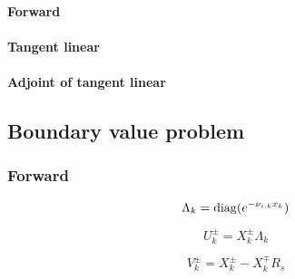 \paragraph{Forward}
\label{sec:dom-layer_quantities-particular_solution-forward}


%
\paragraph{Tangent linear}
\label{sec:dom-layer_quantities-particular_solution-tangent_linear}


%
\paragraph{Adjoint of tangent linear}
\label{sec:dom-layer_quantities-particular_solution-adjoint_of_tangent_linear}


%
\subsection{Boundary value problem}
\label{sec:dom-bvp}


\subsubsection{Forward}
\label{sec:dom-forward}

\begin{equation}
\Lambda_{k} = \mathrm{diag}(e^{-\nu_{i,k} x_{k}})
\label{eq:eigen_bvp-forward-Lambda}
\end{equation}

\begin{equation}
U^{\pm}_{k} = X^{\pm}_{k} \Lambda_{k}
\label{eq:eigen_bvp-forward-U}
\end{equation}

\begin{equation}
V^{\pm}_{k} = X^{\pm}_{k} - X^{\mp}_{k} R_{s}
\label{eq:eigen_bvp-forward-V}
\end{equation}

